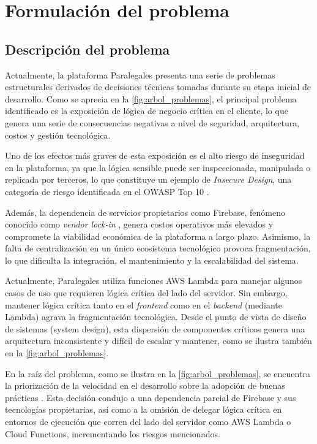 \section{Formulación del problema}

\subsection{Descripción del problema}
Actualmente, la plataforma Paralegales presenta una serie de problemas estructurales derivados de decisiones técnicas tomadas durante su etapa inicial de desarrollo. Como se aprecia en la \autoref{fig:arbol_problemas}, el principal problema identificado es la exposición de lógica de negocio crítica en el cliente, lo que genera una serie de consecuencias negativas a nivel de seguridad, arquitectura, costos y gestión tecnológica.

Uno de los efectos más graves de esta exposición es el alto riesgo de inseguridad en la plataforma, ya que la lógica sensible puede ser inspeccionada, manipulada o replicada por terceros, lo que constituye un ejemplo de \textit{Insecure Design}, una categoría de riesgo identificada en el OWASP Top 10 \cite{OWASP2021}.

Además, la dependencia de servicios propietarios como Firebase, fenómeno conocido como \textit{vendor lock-in} \cite{OparaMartins2016, OparaMartins2014,Harauzek2022}, genera costos operativos más elevados y compromete la viabilidad económica de la plataforma a largo plazo. Asimismo, la falta de centralización en un único ecosistema tecnológico provoca fragmentación, lo que dificulta la integración, el mantenimiento y la escalabilidad del sistema.

Actualmente, Paralegales utiliza funciones AWS Lambda para manejar algunos casos de uso que requieren lógica crítica del lado del servidor. Sin embargo, mantener lógica crítica tanto en el \textit{frontend} como en el \textit{backend} (mediante Lambda) agrava la fragmentación tecnológica. Desde el punto de vista de diseño de sistemas (system design), esta dispersión de componentes críticos genera una arquitectura inconsistente y difícil de escalar y mantener, como se ilustra también en la \autoref{fig:arbol_problemas}.

En la raíz del problema, como se ilustra en la \autoref{fig:arbol_problemas}, se encuentra la priorización de la velocidad en el desarrollo sobre la adopción de buenas prácticas \cite{BirrEngwall2024}. Esta decisión condujo a una dependencia parcial de Firebase y sus tecnologías propietarias, así como a la omisión de delegar lógica crítica en entornos de ejecución que corren del lado del servidor como AWS Lambda o Cloud Functions, incrementando los riesgos mencionados.

